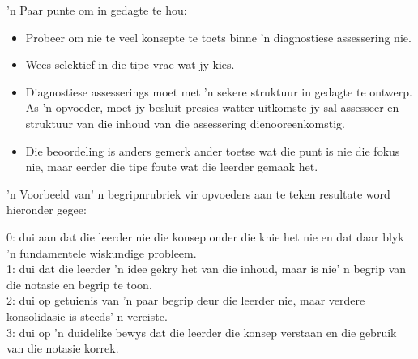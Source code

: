 'n Paar punte om in gedagte te hou:
\begin{itemize}[noitemsep]
\item
  Probeer om nie te veel konsepte te toets binne 'n diagnostiese assessering nie.
\item
  Wees selektief in die tipe vrae wat jy kies.
\item
  Diagnostiese assesserings moet met 'n sekere struktuur in gedagte te ontwerp. As 'n opvoeder, moet jy besluit presies watter uitkomste jy sal assesseer en struktuur van die inhoud van die assessering dienooreenkomstig.
\item
  Die beoordeling is anders gemerk ander toetse wat die punt is nie die fokus nie, maar eerder die tipe foute wat die leerder gemaak het.
\end{itemize}
'n Voorbeeld van' n begripnrubriek vir opvoeders aan te teken resultate word hieronder gegee:

0: dui aan dat die leerder nie die konsep onder die knie het nie en dat daar blyk 'n fundamentele wiskundige probleem.\\
1: dui dat die leerder 'n idee gekry het van die inhoud, maar is nie' n begrip van die notasie en begrip te toon.\\
2: dui op getuienis van 'n paar begrip deur die leerder nie, maar verdere konsolidasie is steeds' n vereiste.\\
3: dui op 'n duidelike bewys dat die leerder die konsep verstaan ​​en die gebruik van die notasie korrek.


